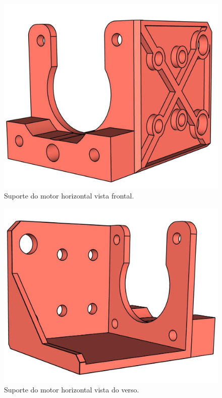 \begin{figure}[H]
\centering
\caption{Suporte do motor horizontal vista frontal.}\label{fig:ressuportemotorhorizontalf}
\includegraphics[scale = 0.4]{figuras/ressuportemotorhorizontalf}
\end{figure}
        
\begin{figure}[H]
\centering
\caption{Suporte do motor horizontal vista do verso.}\label{fig:ressuportemotorhorizontalfv}
\includegraphics[scale = 0.4]{figuras/ressuportemotorhorizontalfv}
\end{figure}
        
